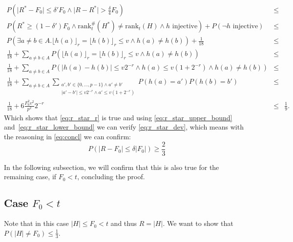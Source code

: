 \documentclass[11pt,a4paper]{article}
\newcommand{\size}[1]{\lvert#1\rvert}
\begin{document}
\begin{eqnarray*}
    P\left( \size{R^*-F_0} \leq \delta' F_0 \wedge \size{R-R^*} > \frac{\delta}{4} F_0 \right) & \leq & \\
    P\left( R^* \geq (1-\delta') F_0 \wedge \mathrm{rank}_t^{\#}(H^*) \neq \mathrm{rank}_t(H) \wedge h \textrm{ injective}\right) + P(\neg h \textrm{ injective}) & \leq & \\
    P\left( \exists a \neq b \in A. \lfloor h(a) \rfloor_r = \lfloor h(b) \rfloor_r \leq v \wedge h(a) \neq h(b) \right) + \frac{1}{18} & \leq & \\
    \frac{1}{18} + \sum_{a \neq b \in A} P\left(\lfloor h(a) \rfloor_r = \lfloor h(b) \rfloor_r \leq v \wedge h(a) \neq h(b) \right) & \leq & \\
    \frac{1}{18} + \sum_{a \neq b \in A} P\left(\size{h(a) - h(b)} \leq v 2^{-r} \wedge h(a) \leq v (1+2^{-r}) \wedge h(a) \neq h(b) \right) & \leq & \\
    \frac{1}{18} + \sum_{a \neq b \in A} \sum_{\substack{a', b' \in \{0,\ldots, p-1\} \wedge a' \neq b' \\ \size{a'-b'} \leq v 2^{-r} \wedge a' \leq v (1+2^{-r})}} P(h(a) = a') P(h(b)= b') & \leq & \\
    \frac{1}{18} + 6 \frac{F_0^2 v^2}{p^2} 2^{-r} & \leq & \frac{1}{9} \textrm{.}
\end{eqnarray*}
Which shows that \autoref{eq:r_star_r} is true and using \autoref{eq:r_star_upper_bound} and~\ref{eq:r_star_lower_bound} we can verify 
\autoref{eq:r_star_dev}, which means with the reasoning in \autoref{eq:concl} we can confirm:
\begin{equation}
    P(\size{R - F_0} \leq \delta \size{F_0}) \geq \frac{2}{3}
\end{equation}

In the following subsection, we will confirm that this is also true for the remaining case, if $F_0 < t$, concluding the proof.
\subsection{Case $F_0 < t$}
Note that in this case $\size{H} \leq F_0 < t$ and thus $R = \size{H}$. We want to show that
$P(\size{H} \neq F_0) \leq \frac{1}{3}$.
\end{document}
